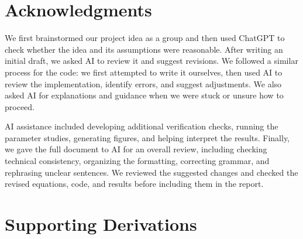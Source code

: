 \documentclass{article}
\begin{document}
\section{Acknowledgments}
We first brainstormed our project idea as a group and then used ChatGPT to check whether the idea and its assumptions were reasonable. After writing an initial draft, we asked AI to review it and suggest revisions. We followed a similar process for the code: we first attempted to write it ourselves, then used AI to review the implementation, identify errors, and suggest adjustments. We also asked AI for explanations and guidance when we were stuck or unsure how to proceed.

AI assistance included developing additional verification checks, running the parameter studies, generating figures, and helping interpret the results. Finally, we gave the full document to AI for an overall review, including checking technical consistency, organizing the formatting, correcting grammar, and rephrasing unclear sentences. We reviewed the suggested changes and checked the revised equations, code, and results before including them in the report.

\clearpage
\appendix
\section{Supporting Derivations}
\label{app:derivation}
\end{document}
